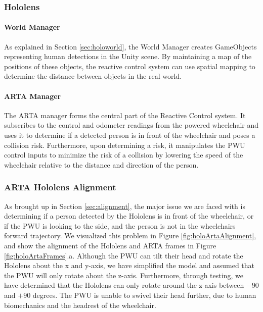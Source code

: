 \subsubsection{Hololens}
\paragraph{World Manager} As explained in Section \ref{sec:holoworld}, the World Manager creates GameObjects representing human detections in the Unity scene. By maintaining a map of the positions of these objects, the reactive control system can use spatial mapping to determine the distance between objects in the real world.

\paragraph{ARTA Manager} The ARTA manager forms the central part of the Reactive Control system. It subscribes to the control and odometer readings from the powered wheelchair and uses it to determine if a detected person is in front of the wheelchair and poses a collision risk. Furthermore, upon determining a risk, it manipulates the PWU control inputs to minimize the risk of a collision by lowering the speed of the wheelchair relative to the distance and direction of the person.

\subsubsection{ARTA Hololens Alignment}
As brought up in Section \ref{sec:alignment}, the major issue we are faced with is determining if a person detected by the Hololens is in front of the wheelchair, or if the PWU is looking to the side, and the person is not in the wheelchairs forward trajectory. We visualized this problem in Figure \ref{fig:holoArtaAlignment}, and show the alignment of the Hololens and ARTA frames in Figure \ref{fig:holoArtaFrames}.a. Although the PWU can tilt their head and rotate the Hololens about the x and y-axis, we have simplified the model and assumed that the PWU will only rotate about the z-axis. Furthermore, through testing, we have determined that the Hololens can only rotate around the z-axis between $-90$ and $+90$ degrees. The PWU is unable to swivel their head further, due to human biomechanics and the headrest of the wheelchair.

